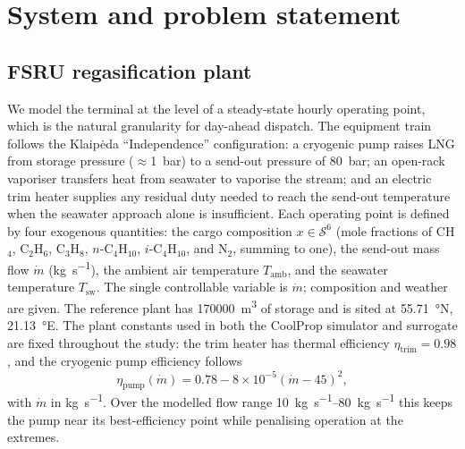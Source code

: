 \documentclass[11pt]{article}
\begin{document}
\section{System and problem statement}
\label{sec:system}

\subsection{FSRU regasification plant}

We model the terminal at the level of a steady-state hourly operating point,
which is the natural granularity for day-ahead dispatch. The equipment train
follows the Klaip\.eda ``Independence'' configuration: a cryogenic pump
raises LNG from storage pressure ($\approx$1~bar) to a send-out
pressure of 80~bar; an open-rack vaporiser transfers heat from
seawater to vaporise the stream; and an electric trim heater supplies any
residual duty needed to reach the send-out temperature when the seawater
approach alone is insufficient. Each operating point is defined by four
exogenous quantities: the cargo composition
$x \in \mathcal{S}^6$ (mole fractions of CH$_4$, C$_2$H$_6$, C$_3$H$_8$,
$n$-C$_4$H$_{10}$, $i$-C$_4$H$_{10}$, and N$_2$, summing to one), the
send-out mass flow $\dot m$ (\si{\kilo\gram\per\second}), the ambient air temperature
$T_{\text{amb}}$, and the seawater temperature $T_{\text{sw}}$. The single
controllable variable is $\dot m$; composition and weather are given. The
reference plant has \SI{170000}{\meter\cubed} of storage and is sited at
\SI{55.71}{\degree}N, \SI{21.13}{\degree}E.
The plant constants used in both the CoolProp simulator and surrogate are fixed
throughout the study: the trim heater has thermal efficiency
$\eta_{\text{trim}}=0.98$, and the cryogenic pump efficiency follows
\[
  \eta_{\text{pump}}(\dot m)
  = 0.78 - 8\times10^{-5}(\dot m-45)^2 ,
\]
with $\dot m$ in \si{\kilo\gram\per\second}. Over the modelled flow range
\SIrange{10}{80}{\kilo\gram\per\second} this keeps the pump near its
best-efficiency point while penalising operation at the extremes.
\end{document}
